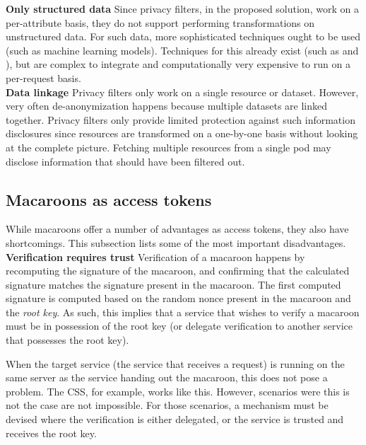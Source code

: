 \noindent \textbf{Only structured data} Since privacy filters, in the proposed solution, work on a per-attribute basis, they do not support performing transformations on unstructured data. For such data, more sophisticated techniques ought to be used (such as machine learning models). Techniques for this already exist (such as \citet{privacy-unstructured-scoring} and \citet{privacy-preserving-unstructured}), but are complex to integrate and computationally very expensive to run on a per-request basis. \\

\noindent \textbf{Data linkage} Privacy filters only work on a single resource or dataset. However, very often de-anonymization happens because multiple datasets are linked together. Privacy filters only provide limited protection against such information disclosures since resources are transformed on a one-by-one basis without looking at the complete picture. Fetching multiple resources from a single pod may disclose information that should have been filtered out.

\subsection{Macaroons as access tokens}
While macaroons offer a number of advantages as access tokens, they also have shortcomings. This subsection lists some of the most important disadvantages.\\

\noindent \textbf{Verification requires trust} Verification of a macaroon happens by recomputing the signature of the macaroon, and confirming that the calculated signature matches the signature present in the macaroon. The first computed signature is computed based on the random nonce present in the macaroon and the \textit{root key}. As such, this implies that a service that wishes to verify a macaroon must be in possession of the root key (or delegate verification to another service that possesses the root key). 

When the target service (the service that receives a request) is running on the same server as the service handing out the macaroon, this does not pose a problem. The \acrlong{CSS}, for example, works like this. However, scenarios were this is not the case are not impossible. For those scenarios, a mechanism must be devised where the verification is either delegated, or the service is trusted and receives the root key.\\

